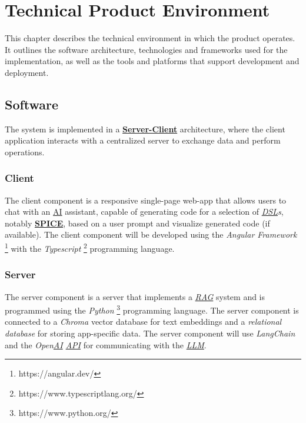 

\chapter{Technical Product Environment}
\label{chap:tech_env}

This chapter describes the technical environment in which the product operates. It outlines the software architecture, technologies and frameworks used for the implementation, as well as the tools and platforms that support development and deployment.

\section{Software}
The system is implemented in a \textbf{\hyperref[def:server-client]{Server-Client}} architecture, where the client application interacts with a centralized server to exchange data and perform operations.  
\subsection{Client}
The client component is a responsive single-page web-app that allows users to chat with an \hyperref[abr:AI]{AI} assistant, capable of generating code for a selection of \textit{\hyperref[abr:DSL]{DSL}s}, notably \textbf{\hyperref[abr:SPICE]{SPICE}}, based on a user prompt and visualize generated code (if available). \newline
The client component will be developed using the  \textit{Angular Framework} \footnote{https://angular.dev/} with the \textit{Typescript} \footnote{https://www.typescriptlang.org/} programming language.

\subsection{Server}
The server component is a server that implements a \textit{\hyperref[abr:RAG]{RAG}} system and is programmed using the \textit{Python} \footnote{https://www.python.org/} programming language. \newline
The server component is connected to a \textit{Chroma} vector database for text embeddings and a \textit{relational database} for storing app-specific data. The server component will use \textit{LangChain} and the \textit{Open\hyperref[abr:AI]{AI} \hyperref[abr:API]{API}} for communicating with the \textit{\hyperref[abr:LLM]{LLM}}.


